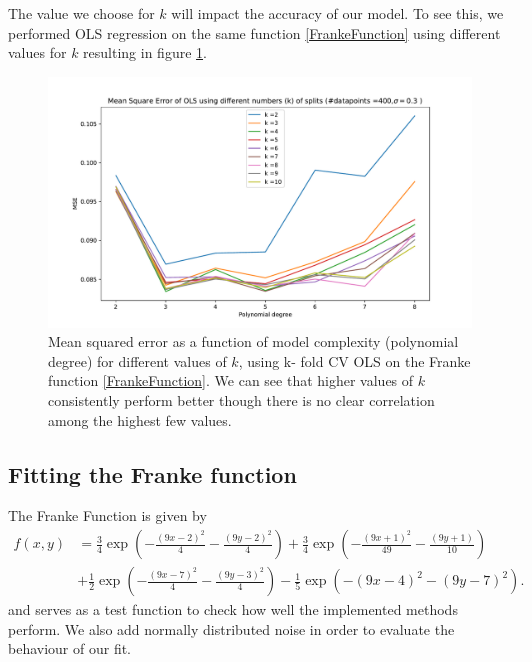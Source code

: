 \documentclass[11pt,a4paper,titlepage]{article}
\begin{document}
The value we choose for $k$ will impact the accuracy of our model. To see this, we performed OLS regression on the same function \eqref{FrankeFunction} using different values for $k$ resulting in figure \ref{bestKOLS}.
\begin{figure}[H]
\centering

\includegraphics[trim=1.4cm 0.2cm 2.5cm 1.2cm, clip=true,scale = 0.6]{MSE_OLS_k_comparison_2to10.pdf}
\caption[MSE from OLS using different number of splits in k-fold CV]{Mean squared error as a function of model complexity (polynomial degree) for different values of $k$, using k- fold CV OLS on the Franke function \eqref{FrankeFunction}. We can see that higher values of $k$ consistently perform better though there is no clear correlation among the highest few values.}\label{bestKOLS}
\end{figure}

\subsection{Fitting the Franke function}
The Franke Function is given by
\begin{align}\label{FrankeFunction}
f(x,y) &= \frac{3}{4}\exp{\left(-\frac{(9x-2)^2}{4} - \frac{(9y-2)^2}{4}\right)}+\frac{3}{4}\exp{\left(-\frac{(9x+1)^2}{49}- \frac{(9y+1)}{10}\right)}\nonumber \\
&+\frac{1}{2}\exp{\left(-\frac{(9x-7)^2}{4} - \frac{(9y-3)^2}{4}\right)} -\frac{1}{5}\exp{\left(-(9x-4)^2 - (9y-7)^2\right) }.
\end{align}
and serves as a test function to check how well the implemented methods perform. We also add normally distributed noise in order to evaluate the behaviour of our fit.
\end{document}
